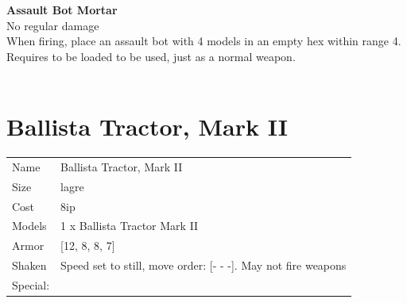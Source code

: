 {\bf Assault Bot Mortar } \\

No regular damage\\ 
When firing, place an assault bot with 4 models in an empty hex within range 4. Requires to be loaded to be used, just as a normal weapon.\\ 





 
\ \\













\clearpage

\section{ Ballista Tractor, Mark II }

\begin{tabular}{ll}
  Name & Ballista Tractor, Mark II \\
  Size & lagre\\
  Cost & 8ip\\
  Models & 1 x Ballista Tractor Mark II\\
  Armor & [12, 8, 8, 7]\\
  Shaken & Speed set to still, move order: [- - -]. May not fire weapons\\
  Special: \\
\end{tabular}

\noindent 

